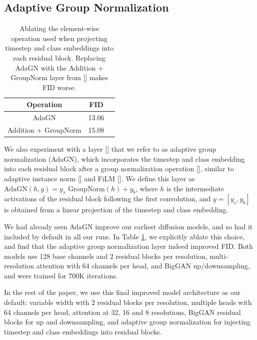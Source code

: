 \documentclass{article}
\newcommand{\shortcite}[1]{[\citenum{#1}]}
\newcommand{\namecite}[1]{\citeauthor{#1} [\citenum{#1}]}
\begin{document}
\subsection{Adaptive Group Normalization}
\label{sec:adapgn}
\begin{table}[t!]
    \begin{center}
    \begin{small}
    \begin{tabular}{ccc}
    \toprule
    Operation & FID \\
    \midrule
    AdaGN & 13.06 \\
    Addition + GroupNorm & 15.08 \\
    \bottomrule
    \end{tabular}
    \end{small}
    \end{center}
    \caption{Ablating the element-wise operation used when projecting timestep and class embeddings into each residual block. Replacing AdaGN with the Addition + GroupNorm layer from \namecite{ddpm} makes FID worse.}
    \label{tab:adagn}
    \vskip -0.2in
\end{table}

We also experiment with a layer \shortcite{improved} that we refer to as adaptive group normalization (AdaGN), which incorporates the timestep and class embedding into each residual block after a group normalization operation \shortcite{groupnorm}, similar to adaptive instance norm \shortcite{stylegan} and FiLM \shortcite{film}. We define this layer as $\text{AdaGN}(h, y) = y_s  \text{ GroupNorm}(h) + y_b$, where $h$ is the intermediate activations of the residual block following the first convolution, and $y = [y_s, y_b]$ is obtained from a linear projection of the timestep and class embedding. 

We had already seen AdaGN improve our earliest diffusion models, and so had it included by default in all our runs. In Table \ref{tab:adagn}, we explicitly ablate this choice, and find that the adaptive group normalization layer indeed improved FID. Both models use 128 base channels and 2 residual blocks per resolution, multi-resolution attention with 64 channels per head, and BigGAN up/downsampling, and were trained for 700K iterations.

In the rest of the paper, we use this final improved model architecture as our default: variable width with 2 residual blocks per resolution, multiple heads with 64 channels per head, attention at 32, 16 and 8 resolutions, BigGAN residual blocks for up and downsampling, and adaptive group normalization for injecting timestep and class embeddings into residual blocks.
\end{document}
